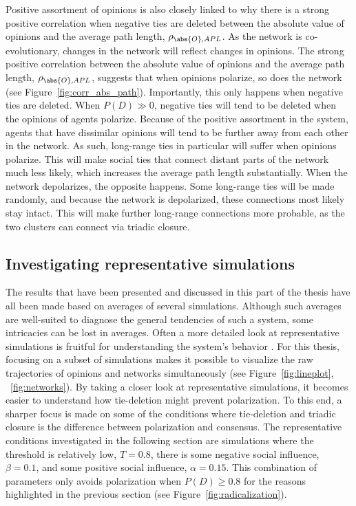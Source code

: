 \documentclass[11pt]{article}
\DeclarePairedDelimiter{\abs}\lvert\rvert
\begin{document}
\noindent Positive assortment of opinions is also closely linked to why there is a strong positive correlation when negative ties are deleted between the absolute value of opinions and the average path length, $\rho_{\abs{O},APL}$. As the network is co-evolutionary, changes in the network will reflect changes in opinions. The strong positive correlation between the absolute value of opinions and the average path length, $\rho_{\abs{O},APL}$, suggests that when opinions polarize, so does the network (see Figure~\ref{fig:corr_abs_path}).
Importantly, this only happens when negative ties are deleted. When $P(D) \gg 0$, negative ties will tend to be deleted when the opinions of agents polarize. Because of the positive assortment in the system, agents that have dissimilar opinions will tend to be further away from each other in the network. As such, long-range ties in particular will suffer when opinions polarize. This will make social ties that connect distant parts of the network much less likely, which increases the average path length substantially. When the network depolarizes, the opposite happens. Some long-range ties will be made randomly, and because the network is depolarized, these connections most likely stay intact. This will make further long-range connections more probable, as the two clusters can connect via triadic closure.

\subsection{Investigating representative simulations}
The results that have been presented and discussed in this part of the thesis have all been made based on averages of several simulations. Although such averages are well-suited to diagnose the general tendencies of such a system, some intricacies can be lost in averages. Often a more detailed look at representative simulations is fruitful for understanding the system's behavior \cite{turner_paths_2018}. For this thesis, focusing on a subset of simulations makes it possible to visualize the raw trajectories of opinions and networks simultaneously (see Figure~\ref{fig:lineplot}, ~\ref{fig:networks}). By taking a closer look at representative simulations, it becomes easier to understand how tie-deletion might prevent polarization. To this end, a sharper focus is made on some of the conditions where tie-deletion and triadic closure is the difference between polarization and consensus. The representative conditions investigated in the following section are simulations where the threshold is relatively low, $T = 0.8$, there is some negative social influence, $\beta = 0.1$, and some positive social influence, $\alpha = 0.15$. This combination of parameters only avoids polarization when $P(D) \geq 0.8$ for the reasons highlighted in the previous section (see Figure~\ref{fig:radicalization}). 
\end{document}
